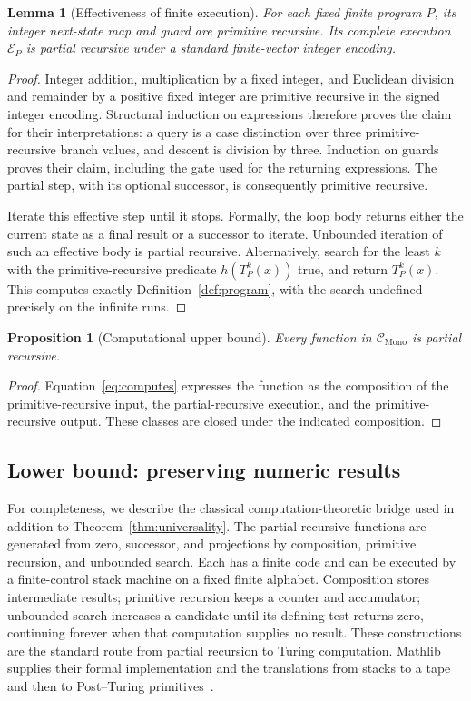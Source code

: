 \documentclass[11pt]{article}
\numberwithin{equation}{section}
\newtheorem{lemma}[theorem]{Lemma}
\newtheorem{proposition}[theorem]{Proposition}
\theoremstyle{definition}
\theoremstyle{remark}
\begin{document}
\begin{lemma}[Effectiveness of finite execution]\label{lem:effective}
For each fixed finite program $P$, its integer next-state map and
guard are primitive recursive. Its complete execution $\mathcal E_P$
is partial recursive under a standard finite-vector integer encoding.
\end{lemma}
\begin{proof}
Integer addition, multiplication by a fixed integer, and Euclidean
division and remainder by a positive fixed integer are primitive
recursive in the signed integer encoding. Structural induction on
expressions therefore proves the claim for their interpretations:
a query is a case distinction over three primitive-recursive branch
values, and descent is division by three. Induction on guards proves
their claim, including the gate used for the returning expressions.
The partial step, with its optional successor, is consequently
primitive recursive.

Iterate this effective step until it stops. Formally, the loop body
returns either the current state as a final result or a successor to
iterate. Unbounded iteration of such an effective body is partial
recursive. Alternatively, search for the least $k$ with the
primitive-recursive predicate $h(T_P^k(x))$ true, and return
$T_P^k(x)$. This computes exactly Definition~\ref{def:program}, with
the search undefined precisely on the infinite runs.
\end{proof}

\begin{proposition}[Computational upper bound]\label{prop:upper}
Every function in $\mathcal C_{\mathrm{Mono}}$ is partial recursive.
\end{proposition}
\begin{proof}
Equation~\eqref{eq:computes} expresses the function as the composition
of the primitive-recursive input, the partial-recursive execution,
and the primitive-recursive output. These classes are closed under
the indicated composition.
\end{proof}

\subsection{Lower bound: preserving numeric results}

For completeness, we describe the classical computation-theoretic
bridge used in addition to Theorem~\ref{thm:universality}. The
partial recursive functions are generated from zero, successor, and
projections by composition, primitive recursion, and unbounded search.
Each has a finite code and can be executed by a finite-control stack
machine on a fixed finite alphabet. Composition stores intermediate
results; primitive recursion keeps a counter and accumulator; unbounded
search increases a candidate until its defining test returns zero,
continuing forever when that computation supplies no result.
These constructions are the standard route from partial recursion to
Turing computation. Mathlib supplies their formal implementation and
the translations from stacks to a tape and then to
Post--Turing primitives~\cite{carneiro2019,mathlibComputability}.
\end{document}
